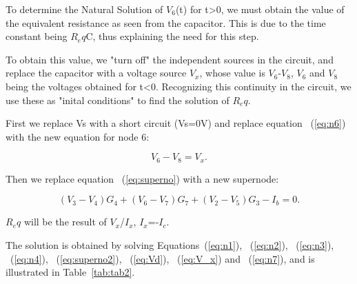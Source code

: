 To determine the Natural Solution of $V_6$(t) for t>0, we must obtain the value of the equivalent resistance as seen from the capacitor. This is due to the time constant being $R_eq$C, thus explaining the need for this step.

To obtain this value, we "turn off" the independent sources in the circuit, and replace the capacitor with a voltage source $V_x$, whose value is $V_6$-$V_8$, $V_6$ and $V_8$ being the voltages obtained for t<0. Recognizing this continuity in the circuit, we use these as "inital conditions" to find the solution of $R_eq$.

First we replace Vs with a short circuit (Vs=0V) and replace equation ~(\ref{eq:n6}) with the new equation for node 6:

\begin{equation}
  V_6-V_8=V_x.
  \label{eq:V_x}
\end{equation}

Then we replace equation ~(\ref{eq:superno}) with a new supernode:

\begin{equation}
  (V_3-V_4)G_4+(V_6-V_7)G_7+(V_2-V_5)G_3-I_b=0.
  \label{eq:superno2}
\end{equation}

$R_eq$ will be the result of $V_x$/$I_x$, $I_x$=-$I_c$.

The solution is obtained by solving Equations~(\ref{eq:n1}), ~(\ref{eq:n2}), ~(\ref{eq:n3}), ~(\ref{eq:n4}), ~(\ref{eq:superno2}), ~(\ref{eq:Vd}), ~(\ref{eq:V_x}) and ~(\ref{eq:n7}), and is illustrated in Table~\ref{tab:tab2}.

